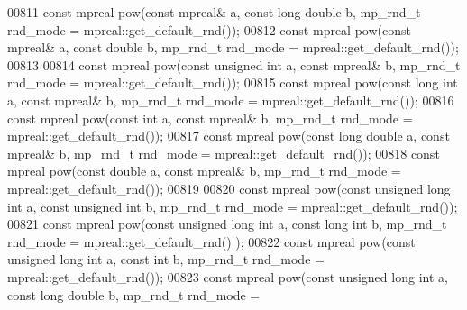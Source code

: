 \begin{DoxyCode}
00811 \textcolor{keyword}{const} mpreal pow(\textcolor{keyword}{const} mpreal& a, \textcolor{keyword}{const} \textcolor{keywordtype}{long} \textcolor{keywordtype}{double} b, mp\_rnd\_t rnd\_mode = mpreal::get\_default\_rnd());
00812 \textcolor{keyword}{const} mpreal pow(\textcolor{keyword}{const} mpreal& a, \textcolor{keyword}{const} \textcolor{keywordtype}{double} b, mp\_rnd\_t rnd\_mode = mpreal::get\_default\_rnd());
00813 
00814 \textcolor{keyword}{const} mpreal pow(\textcolor{keyword}{const} \textcolor{keywordtype}{unsigned} \textcolor{keywordtype}{int} a, \textcolor{keyword}{const} mpreal& b, mp\_rnd\_t rnd\_mode = mpreal::get\_default\_rnd());
00815 \textcolor{keyword}{const} mpreal pow(\textcolor{keyword}{const} \textcolor{keywordtype}{long} \textcolor{keywordtype}{int} a, \textcolor{keyword}{const} mpreal& b, mp\_rnd\_t rnd\_mode = mpreal::get\_default\_rnd());
00816 \textcolor{keyword}{const} mpreal pow(\textcolor{keyword}{const} \textcolor{keywordtype}{int} a, \textcolor{keyword}{const} mpreal& b, mp\_rnd\_t rnd\_mode = mpreal::get\_default\_rnd());
00817 \textcolor{keyword}{const} mpreal pow(\textcolor{keyword}{const} \textcolor{keywordtype}{long} \textcolor{keywordtype}{double} a, \textcolor{keyword}{const} mpreal& b, mp\_rnd\_t rnd\_mode = mpreal::get\_default\_rnd());
00818 \textcolor{keyword}{const} mpreal pow(\textcolor{keyword}{const} \textcolor{keywordtype}{double} a, \textcolor{keyword}{const} mpreal& b, mp\_rnd\_t rnd\_mode = mpreal::get\_default\_rnd());
00819 
00820 \textcolor{keyword}{const} mpreal pow(\textcolor{keyword}{const} \textcolor{keywordtype}{unsigned} \textcolor{keywordtype}{long} \textcolor{keywordtype}{int} a, \textcolor{keyword}{const} \textcolor{keywordtype}{unsigned} \textcolor{keywordtype}{int} b, mp\_rnd\_t rnd\_mode = 
      mpreal::get\_default\_rnd());
00821 \textcolor{keyword}{const} mpreal pow(\textcolor{keyword}{const} \textcolor{keywordtype}{unsigned} \textcolor{keywordtype}{long} \textcolor{keywordtype}{int} a, \textcolor{keyword}{const} \textcolor{keywordtype}{long} \textcolor{keywordtype}{int} b, mp\_rnd\_t rnd\_mode = mpreal::get\_default\_rnd()
      );
00822 \textcolor{keyword}{const} mpreal pow(\textcolor{keyword}{const} \textcolor{keywordtype}{unsigned} \textcolor{keywordtype}{long} \textcolor{keywordtype}{int} a, \textcolor{keyword}{const} \textcolor{keywordtype}{int} b, mp\_rnd\_t rnd\_mode = mpreal::get\_default\_rnd());
00823 \textcolor{keyword}{const} mpreal pow(\textcolor{keyword}{const} \textcolor{keywordtype}{unsigned} \textcolor{keywordtype}{long} \textcolor{keywordtype}{int} a, \textcolor{keyword}{const} \textcolor{keywordtype}{long} \textcolor{keywordtype}{double} b, mp\_rnd\_t rnd\_mode = 

\end{DoxyCode}
